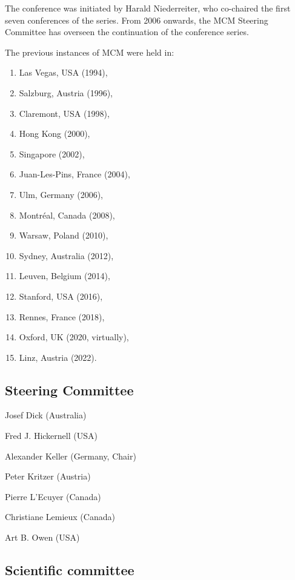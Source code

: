 The conference was initiated by Harald Niederreiter, who co-chaired the
first seven conferences of the series. From 2006 onwards, the MCM Steering Committee has
overseen the continuation of the conference series.

The previous instances of MCM were held in:
\begin{enumerate}
\item Las Vegas, USA (1994),
\item Salzburg, Austria (1996),
\item Claremont, USA (1998),
\item Hong Kong (2000),
\item Singapore (2002),
\item Juan-Les-Pins, France (2004),
\item Ulm, Germany (2006),
\item Montr\'{e}al, Canada (2008),
\item Warsaw, Poland (2010),
\item Sydney, Australia (2012),
\item Leuven, Belgium (2014),
\item Stanford, USA (2016),
\item Rennes, France (2018),
\item Oxford, UK (2020, virtually),
\item Linz, Austria (2022).
\end{enumerate}



\newpage
\subsection{Steering Committee}

\setlength{\columnsep}{1cm}
\begin{multicols}{2}
\raggedright

Josef Dick (Australia)

Fred J. Hickernell (USA)

Alexander Keller (Germany, Chair)

Peter Kritzer (Austria)

Pierre L'Ecuyer (Canada)

Christiane Lemieux (Canada)

Art B. Owen (USA)


\end{multicols}

\clearpage

\subsection{Scientific committee}



